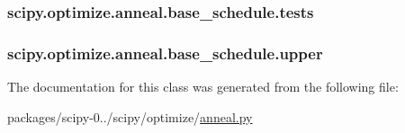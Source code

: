 \subsubsection[{tests}]{\setlength{\rightskip}{0pt plus 5cm}scipy.\+optimize.\+anneal.\+base\+\_\+schedule.\+tests}\label{classscipy_1_1optimize_1_1anneal_1_1base__schedule_a464838842457f4364f9115ae8a965da2}
\hypertarget{classscipy_1_1optimize_1_1anneal_1_1base__schedule_ae7a20d41d80970a6c85b22cc22569071}{}
\subsubsection[{upper}]{\setlength{\rightskip}{0pt plus 5cm}scipy.\+optimize.\+anneal.\+base\+\_\+schedule.\+upper}\label{classscipy_1_1optimize_1_1anneal_1_1base__schedule_ae7a20d41d80970a6c85b22cc22569071}


The documentation for this class was generated from the following file\+:\begin{DoxyCompactItemize}
\item 
packages/scipy-\/0../scipy/optimize/\hyperlink{anneal_8py}{anneal.\+py}\end{DoxyCompactItemize}

